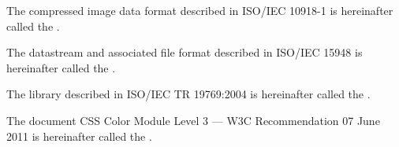 \pnum
The compressed image data format described in ISO/IEC 10918-1 is hereinafter called the .

\pnum
The datastream and associated file format described in ISO/IEC 15948 is hereinafter called the .

\pnum
The library described in ISO/IEC TR 19769:2004 is hereinafter called the
.

\pnum
The document CSS Color Module Level 3 --- W3C Recommendation 07 June 2011 is 
hereinafter called the .


